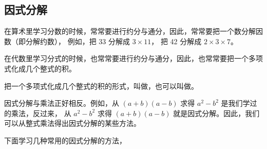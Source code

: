 \subsection{因式分解}\label{subsec:7-1}

在算术里学习分数的时候，常常要进行约分与通分，因此，常常要把一个数分解因数（即分解约数），
例如，把 33 分解成 $3 \times 11$， 把 42 分解成 $2 \times 3 \times 7$。

在代数里学习分式的时候，也常常要进行约分与通分，因此，也常常要把一个多项式化成几个整式的积。

把一个多项式化成几个整式的积的形式，叫做，也可以叫做。

因式分解与乘法正好相反。例如，从 $(a + b)(a - b)$ 求得 $a^2 - b^2$ 是我们学过的乘法，反过来，
从 $a^2 - b^2$ 求得 $(a + b)(a - b)$ 就是因式分解。因此，我们可以从整式乘法得出因式分解的某些方法。

下面学习几种常用的因式分解的方法，

